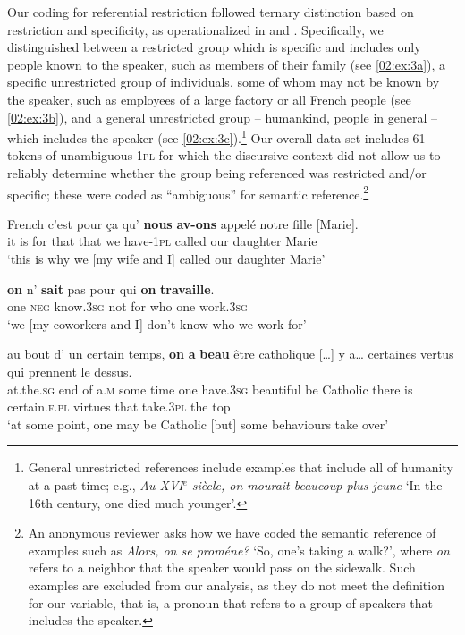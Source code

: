 \documentclass[output=paper,colorlinks,citecolor=brown]{langscibook}
\begin{document}
Our coding for referential restriction followed  ternary distinction based on restriction and specificity, as operationalized in \citet{rehner_learning_2003} and \citet[482]{king_interplay_2011}. Specifically, we distinguished between a restricted group which is specific and includes only people known to the speaker, such as members of their family (see \ref{02:ex:3a}), a specific unrestricted group of individuals, some of whom may not be known by the speaker, such as employees of a large factory or all French people (see \ref{02:ex:3b}), and a general unrestricted group -- humankind, people in general -- which includes the speaker (see \ref{02:ex:3c}).\footnote{General unrestricted references include examples that include all of humanity at a past time; e.g., \textit{Au XVI}$^e$ \textit{siècle, on mourait beaucoup plus jeune} ‘In the 16th century, one died much younger’.}  Our overall data set includes 61 tokens of unambiguous 1\textsc{pl} for which the discursive context did not allow us to reliably determine whether the group being referenced was restricted and/or specific; these were coded as ``ambiguous'' for semantic reference.\footnote{An anonymous reviewer asks how we have coded the semantic reference of examples such as \textit{Alors, on se proméne?} ‘So, one’s taking a walk?’, where \textit{on} refers to a neighbor that the speaker would pass on the sidewalk. Such examples are excluded from our analysis, as they do not meet the definition for our variable, that is, a pronoun that refers to a group of speakers that includes the speaker.}

\ea \label{02:ex:3} French
\ea\label{02:ex:3a} \gll c’est  pour ça     qu’	 \textbf{nous} \textbf{av-ons} 	 appelé  notre  fille 	  [Marie]. \\
{it is}   for    that  that we    have-1\textsc{pl} called   our     daughter Marie\\
\glt ‘this is why we [my wife and I] called our daughter Marie’

\ex\label{02:ex:3b} \gll \textbf{on} 	n’      \textbf{sait} 	  pas  pour  qui   \textbf{on}    \textbf{travaille}. \\
one 	\textsc{neg}  know.3\textsc{sg} not  for     who  one  work.3\textsc{sg}\\
\glt ‘we [my coworkers and I] don’t know who we work for’

\ex\label{02:ex:3c} \gll au 	        bout  d’ un 	certain temps, 	\textbf{on}   \textbf{a} 		\textbf{beau} 	    être catholique [\ldots] y 	a…  certaines     vertus   qui   prennent  le    dessus.\\
    at.the.\textsc{sg}   end   of a.\textsc{m}	some   time 	one  have.3\textsc{sg} 	beautiful  be Catholic 	 {}  there is     certain.\textsc{f}.\textsc{pl} virtues  that  take.3\textsc{pl}   the   top\\ 
\glt  ‘at some point, one may be Catholic [but] some behaviours take over’ \\
\end{document}
